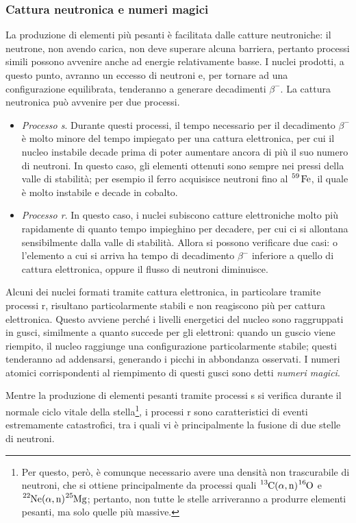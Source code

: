 \documentclass[11pt, a4paper]{scrartcl}
\theoremstyle{style}
\theoremstyle{style1}
\numberwithin{equation}{subsection}
\begin{document}
\subsubsection{Cattura neutronica e numeri magici}
La produzione di elementi pi\`u pesanti \`e facilitata dalle catture neutroniche: il neutrone, non avendo carica, non deve superare alcuna barriera, pertanto processi simili possono avvenire anche ad energie relativamente basse.
I nuclei prodotti, a questo punto, avranno un eccesso di neutroni e, per tornare ad una configurazione equilibrata, tenderanno a generare decadimenti $\beta ^-$.
La cattura neutronica pu\`o avvenire per due processi.
\begin{itemize}
	\item \textit{Processo s}. 
		Durante questi processi, il tempo necessario per il decadimento $\beta ^-$ \`e molto minore del tempo impiegato per una cattura elettronica, per cui il nucleo instabile decade prima di poter aumentare ancora di pi\`u il suo numero di neutroni.
		In questo caso, gli elementi ottenuti sono sempre nei pressi della valle di stabilit\`a; per esempio il ferro acquisisce neutroni fino al $\ce{^{59} Fe}$, il quale \`e molto instabile e decade in cobalto.
	\item \textit{Processo r}. 
		In questo caso, i nuclei subiscono catture elettroniche molto pi\`u rapidamente di quanto tempo impieghino per decadere, per cui ci si allontana sensibilmente dalla valle di stabilit\`a.
		Allora si possono verificare due casi: o l'elemento a cui si arriva ha tempo di decadimento $\beta ^-$ inferiore a quello di cattura elettronica, oppure il flusso di neutroni diminuisce.
\end{itemize}
Alcuni dei nuclei formati tramite cattura elettronica, in particolare tramite processi r, risultano particolarmente stabili e non reagiscono pi\`u per cattura elettronica. 
Questo avviene perch\'e i livelli energetici del nucleo sono raggruppati in gusci, similmente a quanto succede per gli elettroni: quando un guscio viene riempito, il nucleo raggiunge una configurazione particolarmente stabile; questi tenderanno ad addensarsi, generando i picchi in abbondanza osservati.
I numeri atomici corrispondenti al riempimento di questi gusci sono detti \textit{numeri magici}.

Mentre la produzione di elementi pesanti tramite processi s si verifica durante il normale ciclo vitale della stella\footnote{Per questo, per\`o, \`e comunque necessario avere una densit\`a non trascurabile di neutroni, che si ottiene principalmente da processi quali $\ce{^{13}C(\alpha ,n)^{16}O}$ e $\ce{^{22}Ne(\alpha ,n)^{25}Mg}$; pertanto, non tutte le stelle arriveranno a produrre elementi pesanti, ma solo quelle pi\`u massive.}, i processi r sono caratteristici di eventi estremamente catastrofici, tra i quali vi \`e principalmente la fusione di due stelle di neutroni.
\end{document}
